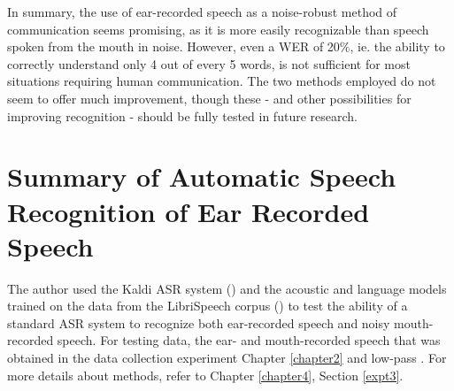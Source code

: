 In summary, the use of ear-recorded speech as a noise-robust method of communication seems promising, as it is more easily recognizable than speech spoken from the mouth in noise.  However, even a WER of 20\%, ie. the ability to correctly understand only 4 out of every 5 words, is not sufficient for most situations requiring human communication.  The two methods employed do not seem to offer much improvement, though these - and other possibilities for improving recognition - should be fully tested in future research.



\section{Summary of Automatic Speech Recognition of Ear Recorded Speech}\label{sec:chap4-review}

The author used the Kaldi ASR system (\cite{povey:11}) and the acoustic and language models trained on the data from the LibriSpeech corpus (\cite{panayotov:15}) to test the ability of a standard ASR system to recognize both ear-recorded speech and noisy mouth-recorded speech.  For testing data, the ear- and mouth-recorded speech that was \DIFdelbegin {}\DIFdelend obtained in the data collection experiment \DIFdelbegin {}\DIFdelend \DIFaddbegin {}\DIFaddend Chapter \ref{chapter2} and \DIFdelbegin {}\DIFdelend \DIFaddbegin {}\DIFaddend low-pass \DIFdelbegin {}\DIFdelend \DIFaddbegin {}\DIFaddend .  For more details about \DIFdelbegin {}\DIFdelend \DIFaddbegin {}\DIFaddend methods, refer to Chapter \ref{chapter4}, Section \ref{expt3}.

